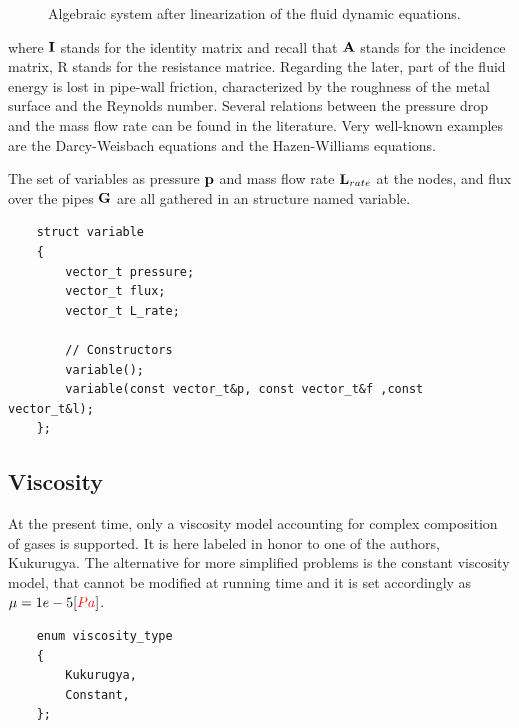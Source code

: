 \begin{figure}[H]
    \centering
    
    \caption{Algebraic system after linearization of the fluid dynamic equations.}
    \label{fig: fluid_system}
\end{figure}
where ${\mathbf I}$ stands for the identity matrix and recall that ${\mathbf A}$ stands for the incidence matrix, R stands for the resistance matrice. Regarding the later, part of the fluid energy is lost in pipe-wall friction, characterized by the roughness of the metal surface and the Reynolds number. Several relations between the pressure drop and the mass flow rate can be found in the literature. Very well-known examples are the Darcy-Weisbach equations and the Hazen-Williams equations. 

The set of variables as pressure ${\mathbf p}$ and mass flow rate ${\mathbf L}_{rate}$ at the nodes, and flux over the pipes ${\mathbf G}$ are all gathered in an structure named variable. 
\begin{verbatim}
    struct variable
    {
        vector_t pressure;
        vector_t flux;
        vector_t L_rate;

        // Constructors
        variable();
        variable(const vector_t&p, const vector_t&f ,const vector_t&l);
    };
\end{verbatim}

\subsection{Viscosity}

At the present time, only a  viscosity model accounting for complex composition of gases is supported. It is here labeled in honor to one of the authors, Kukurugya. The alternative for more simplified problems is the constant viscosity model, that cannot be modified at running time and it is set accordingly as $\mu = 1e-5 [\textcolor{red}{{Pa}}]$. 

\begin{verbatim}
    enum viscosity_type
    {
        Kukurugya,
        Constant,
    };
\end{verbatim}

